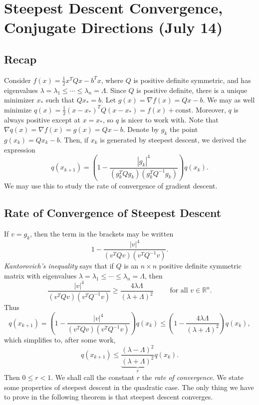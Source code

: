 \documentclass[11pt]{book}
\newcommand{\R}{\mathbb{R}}
\begin{document}
\newpage

\section{Steepest Descent Convergence, Conjugate Directions (July 14)}

\subsection{Recap}

Consider $f(x) = \frac{1}{2}x^TQx - b^Tx$, where $Q$ is positive definite symmetric, and has eigenvalues $\lambda = \lambda_1 \leq \cdots \leq \lambda_n = \Lambda$. Since $Q$ is positive definite, there is a unique minimizer $x_*$ such that $Qx_* = b$. Let $g(x) = \nabla f(x) = Qx - b$. We may as well minimize $q(x) = \frac{1}{2}(x-x_*)^TQ(x-x_*) = f(x) + \mathrm{const}$. Moreover, $q$ is always positive except at $x = x_*$, so $q$ is nicer to work with. Note that $\nabla q(x) = \nabla f(x) = g(x) = Qx - b$. Denote by $g_k$ the point $g(x_k) = Qx_k - b$. Then, if $x_k$ is generated by steepest descent, we derived the expression
\[
q(x_{k+1}) = \left( 1 - \frac{|g_k|^4}{(g_k^TQg_k)(g_k^TQ^{-1}g_k)} \right)q(x_k).
\]
We may use this to study the rate of convergence of gradient descent.

\subsection{Rate of Convergence of Steepest Descent} 

If $v = g_k$, then the term in the brackets may be written
\[
1 - \frac{|v|^4}{(v^TQv)(v^TQ^{-1}v)}.
\]
\emph{Kantorovich's inequality} says that if $Q$ is an $n \times n$ positive definite symmetric matrix with eigenvalues $\lambda = \lambda_1 \leq \cdots \leq \lambda_n = \Lambda$, then
\[
\frac{|v|^4}{(v^T Q v)(v^T Q^{-1} v)} \geq \frac{4\lambda\Lambda}{(\lambda+\Lambda)^2} \qquad \text{ for all } v \in \R^n.
\]
Thus
\[
q(x_{k+1}) = \left( 1 - \frac{|v|^4}{(v^TQv)(v^TQ^{-1}v)} \right)q(x_k) \leq \left( 1 - \frac{4\lambda\Lambda}{(\lambda+\Lambda)^2} \right) q(x_k),
\]
which simplifies to, after some work,
\[
q(x_{k+1}) \leq \underbrace{\frac{(\lambda - \Lambda)^2}{(\lambda + \Lambda)^2}}_{r} q(x_k).
\]
Then $0 \leq r < 1$. We shall call the constant $r$ the \emph{rate of convergence}. We state some properties of steepest descent in the quadratic case. The only thing we have to prove in the following theorem is that steepest descent converges.
\end{document}
